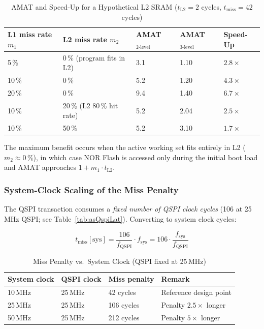 \begin{table}[H]
\caption{AMAT and Speed-Up for a Hypothetical L2 SRAM
         ($t_\text{L2} = 2$ cycles, $t_\text{miss} = 42$ cycles)}
\label{tab:asMemSpeedup}
\centering
\begin{tabularx}{\textwidth}{|X |X |l |l |l|}
  \hline
  L1 miss rate $m_1$ & L2 miss rate $m_2$ & AMAT$_\text{2-level}$ &
  AMAT$_\text{3-level}$ & Speed-Up \\
  \hline
  \hline
  5\,\%  & 0\,\% (program fits in L2)  & 3.1 & 1.10 & $2.8\times$ \\
  \hline
  10\,\% & 0\,\%                       & 5.2 & 1.20 & $4.3\times$ \\
  \hline
  20\,\% & 0\,\%                       & 9.4 & 1.40 & $6.7\times$ \\
  \hline
  10\,\% & 20\,\% (L2 80\,\% hit rate) & 5.2 & 2.04 & $2.5\times$ \\
  \hline
  10\,\% & 50\,\%                       & 5.2 & 3.10 & $1.7\times$ \\
  \hline
\end{tabularx}
\end{table}

The maximum benefit occurs when the active working set fits entirely
in L2 ($m_2 \approx 0\,\%$), in which case NOR Flash is accessed only
during the initial boot load and AMAT approaches $1 + m_1 \cdot t_\text{L2}$.

\subsubsection{System-Clock Scaling of the Miss Penalty}

The QSPI transaction consumes a \emph{fixed number of QSPI clock cycles}
(106 at 25\,MHz QSPI; see Table~\ref{tab:asQspiLat}).
Converting to system clock cycles:

\[
  t_\text{miss}[\text{sys}] = \frac{106}{f_\text{QSPI}} \cdot f_\text{sys}
  = 106 \cdot \frac{f_\text{sys}}{f_\text{QSPI}}
\]

\begin{table}[H]
\caption{Miss Penalty vs.\ System Clock (QSPI fixed at 25\,MHz)}
\label{tab:asQspiMissPenaltyScaling}
\centering
\begin{tabularx}{\textwidth}{|l |l |l |X|}
  \hline
  System clock & QSPI clock & Miss penalty & Remark \\
  \hline
  \hline
  10\,MHz & 25\,MHz & 42 cycles  & Reference design point \\
  \hline
  25\,MHz & 25\,MHz & 106 cycles & Penalty $2.5\times$ longer \\
  \hline
  50\,MHz & 25\,MHz & 212 cycles & Penalty $5\times$ longer \\
  \hline
\end{tabularx}
\end{table}

